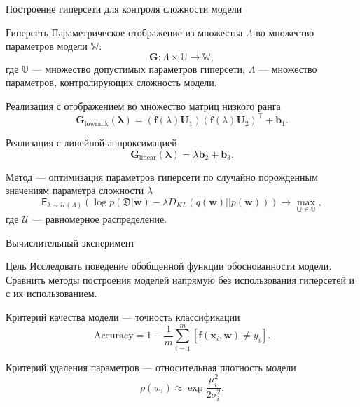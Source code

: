 \documentclass[9pt,pdf,hyperref={unicode}]{beamer}
\begin{document}
\begin{frame}[shrink=5]{Построение гиперсети для контроля сложности модели}
\begin{block}{Гиперсеть}
    Параметрическое отображение из множества $\Lambda$ во множество параметров модели $\mathbb{W}$:
    \[ \mathbf{G}: \Lambda \times \mathbb{U} \to \mathbb{W},\]
    где $\mathbb{U}$ --- множество допустимых параметров гиперсети, $\Lambda$ --- множество параметров, контролирующих сложность модели. 
\end{block}
\begin{block}{Реализация с отображением во множество матриц низкого ранга}
    \begin{equation*}
        \mathbf{G}_\text{lowrank}(\mathbf{\lambda})= 
        (\mathbf{f}(\lambda)\mathbf{U}_1) (\mathbf{f} (\lambda) \mathbf{U}_2)^\top + \mathbf{b}_1.
    \end{equation*}
\end{block}
\begin{block}{Реализация с линейной аппроксимацией}
    \begin{equation*}
    \label{hyper2}
    \mathbf{G}_\text{linear}(\mathbf{\lambda})= \lambda\mathbf{b}_2 + \mathbf{b}_3.
    \end{equation*}
\end{block}
\begin{block}{Метод --- оптимизация параметров гиперсети по случайно порожденным значениям параметра сложности $\lambda $}
    \[\mathsf{E}_{\lambda \sim \mathcal{U}(\Lambda)} (\log p(\mathfrak{D}| \mathbf{w}) - \lambda D_{KL}(q(\mathbf{w})||p(\mathbf{w})))
\to \max_{\mathbf{U} \in \mathbb{U}},\]
где $\mathcal{U}$ --- равномерное распределение.
\end{block}


\end{frame}
\begin{frame}{Вычислительный эксперимент}
\begin{block}{Цель}
		Исследовать поведение обобщенной функции обоснованности модели. Сравнить методы построения моделей напрямую без использования гиперсетей и с их использованием.
\end{block}
\begin{block}{Критерий качества модели --- точность классификации}
    \[ \text{Accuracy} = 1 - \frac{1}{m} \sum_{i = 1}^{m}[\mathbf{f}(\mathbf{x}_i, \mathbf{w}) \neq y_i].\]
\end{block}
\begin{block}{Критерий удаления параметров --- относительная плотность модели}
\[ \rho(w_i) \approx \exp{\frac{\mu_i^{2}}{2 \sigma_i^{2}}}. \]
\end{block}

\end{frame}
\end{document}
